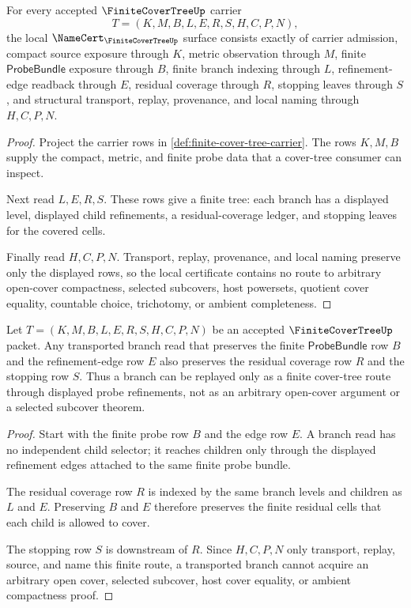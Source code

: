 \begin{theorem}
\label{thm:finite-cover-tree-namecert-obligations}
For every accepted $\FiniteCoverTreeUp$ carrier
$$
T=(K,M,B,L,E,R,S,H,C,P,N),
$$
the local $\NameCert_{\FiniteCoverTreeUp}$ surface consists exactly of carrier admission, compact source exposure through $K$, metric observation through $M$, finite $\mathsf{ProbeBundle}$ exposure through $B$, finite branch indexing through $L$, refinement-edge readback through $E$, residual coverage through $R$, stopping leaves through $S$, and structural transport, replay, provenance, and local naming through $H,C,P,N$.
\end{theorem}
\begin{proof}
Project the carrier rows in \autoref{def:finite-cover-tree-carrier}. The rows $K,M,B$ supply the compact, metric, and finite probe data that a cover-tree consumer can inspect.

Next read $L,E,R,S$. These rows give a finite tree: each branch has a displayed level, displayed child refinements, a residual-coverage ledger, and stopping leaves for the covered cells.

Finally read $H,C,P,N$. Transport, replay, provenance, and local naming preserve only the displayed rows, so the local certificate contains no route to arbitrary open-cover compactness, selected subcovers, host powersets, quotient cover equality, countable choice, trichotomy, or ambient completeness.
\end{proof}

\begin{theorem}
\label{thm:finite-cover-tree-branch-stability}
Let $T=(K,M,B,L,E,R,S,H,C,P,N)$ be an accepted $\FiniteCoverTreeUp$ packet. Any transported branch read that preserves the finite $\mathsf{ProbeBundle}$ row $B$ and the refinement-edge row $E$ also preserves the residual coverage row $R$ and the stopping row $S$. Thus a branch can be replayed only as a finite cover-tree route through displayed probe refinements, not as an arbitrary open-cover argument or a selected subcover theorem.
\end{theorem}
\begin{proof}
Start with the finite probe row $B$ and the edge row $E$. A branch read has no independent child selector; it reaches children only through the displayed refinement edges attached to the same finite probe bundle.

The residual coverage row $R$ is indexed by the same branch levels and children as $L$ and $E$. Preserving $B$ and $E$ therefore preserves the finite residual cells that each child is allowed to cover.

The stopping row $S$ is downstream of $R$. Since $H,C,P,N$ only transport, replay, source, and name this finite route, a transported branch cannot acquire an arbitrary open cover, selected subcover, host cover equality, or ambient compactness proof.
\end{proof}

